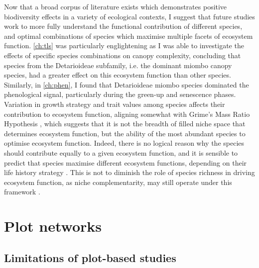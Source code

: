 \begin{refsection}
Now that a broad corpus of literature exists which demonstrates positive biodiversity effects in a variety of ecological contexts, I suggest that future studies work to more fully understand the functional contribution of different species, and optimal combinations of species which maximise multiple facets of ecosystem function. \autoref{ch:tls} was particularly englightening as I was able to investigate the effects of specific species combinations on canopy complexity, concluding that species from the Detarioideae subfamily, i.e. the dominant miombo canopy species, had a greater effect on this ecosystem function than other species. Similarly, in \autoref{ch:phen}, I found that Detarioideae miombo species dominated the phenological signal, particularly during the green-up and senescence phases. Variation in growth strategy and trait values among species affects their contribution to ecosystem function, aligning somewhat with Grime's Mass Ratio Hypothesis \citep{Grime1998}, which suggests that it is not the breadth of filled niche space that determines ecosystem function, but the ability of the most abundant species to optimise ecosystem function. Indeed, there is no logical reason why the species should contribute equally to a given ecosystem function, and it is sensible to predict that species maximise different ecosystem functions, depending on their life history strategy \citep{}. This is not to diminish the role of species richness in driving ecosystem function, as niche complementarity, may still operate under this framework \citep{}.


\section{Plot networks}
\label{discussion:sec:plot_networks}



\subsection{Limitations of plot-based studies}
\label{discussion:ssec:plot_limits}


\end{refsection}
